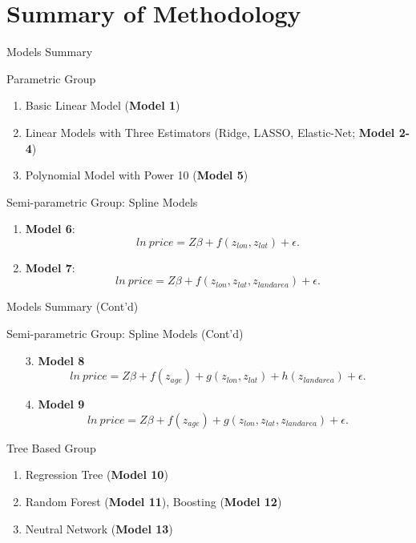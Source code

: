 \documentclass{beamer}
\begin{document}
\section{Summary of Methodology}

\begin{frame}[t]{Models Summary}

\begin{block}{Parametric Group}
\begin{enumerate}
\item Basic Linear Model (\textbf{Model 1})
\item Linear Models with Three Estimators (Ridge, LASSO, Elastic-Net; \textbf{Model 2-4})
\item Polynomial Model with Power 10 (\textbf{Model 5})
\end{enumerate}
\end{block}

\begin{block}{Semi-parametric Group: Spline Models}
\begin{enumerate}
\item \textbf{Model 6}:
\begin{equation}
ln~price = Z\beta + f(z_{lon}, z_{lat}) + \epsilon.
\end{equation}
\item \textbf{Model 7}:
\begin{equation}
ln~price = Z\beta + f(z_{lon}, z_{lat}, z_{land area}) + \epsilon.
\end{equation}
\end{enumerate}
\end{block}

\end{frame}

\begin{frame}[t]{Models Summary (Cont'd)}

\begin{block}{Semi-parametric Group: Spline Models (Cont'd)}
\begin{enumerate}
\item[3.] \textbf{Model 8}
\begin{equation}
ln~price = Z\beta +f(z_{age}) + g(z_{lon}, z_{lat}) +  h(z_{land area}) + \epsilon.
\end{equation}
\item[4.] \textbf{Model 9}
\begin{equation}
ln~price = Z\beta + f(z_{age}) + g(z_{lon}, z_{lat}, z_{land area}) + \epsilon.
\end{equation}
\end{enumerate}
\end{block}


\begin{block}{Tree Based Group}
\begin{enumerate}
\item Regression Tree (\textbf{Model 10})
\item Random Forest (\textbf{Model 11}), Boosting (\textbf{Model 12})
\item Neutral Network (\textbf{Model 13})
\end{enumerate}
\end{block}
\end{frame}
\end{document}
